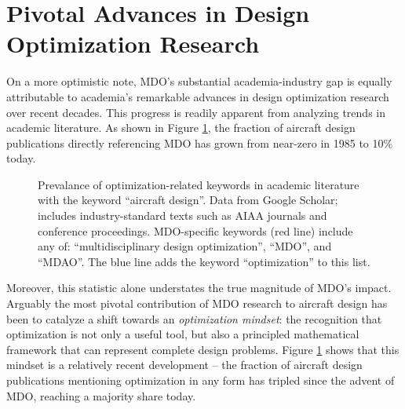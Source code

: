 \documentclass[12pt,vi,oneside]{report}
\begin{document}
    \section{Pivotal Advances in Design Optimization Research}
    \label{sec:literature_advances}

    On a more optimistic note, MDO's substantial academia-industry gap is equally attributable to academia's remarkable advances in design optimization research over recent decades. This progress is readily apparent from analyzing trends in academic literature. As shown in Figure \ref{fig:mdo_citation_counts}, the fraction of aircraft design publications directly referencing MDO has grown from near-zero in 1985 to 10\% today.

    \begin{figure}[h]
        \centering
        \caption{Prevalance of optimization-related keywords in academic literature with the keyword ``aircraft design''. Data from Google Scholar; includes industry-standard texts such as AIAA journals and conference proceedings. MDO-specific keywords (red line) include any of: ``multidisciplinary design optimization'', ``MDO'', and ``MDAO''. The blue line adds the keyword ``optimization'' to this list.}
        \label{fig:mdo_citation_counts}
    \end{figure}

    Moreover, this statistic alone understates the true magnitude of MDO's impact. Arguably the most pivotal contribution of MDO research to aircraft design has been to catalyze a shift towards an \textit{optimization mindset}: the recognition that optimization is not only a useful tool, but also a principled mathematical framework that can represent complete design problems. Figure \ref{fig:mdo_citation_counts} shows that this mindset is a relatively recent development -- the fraction of aircraft design publications mentioning optimization in any form has tripled since the advent of MDO, reaching a majority share today.
\end{document}
